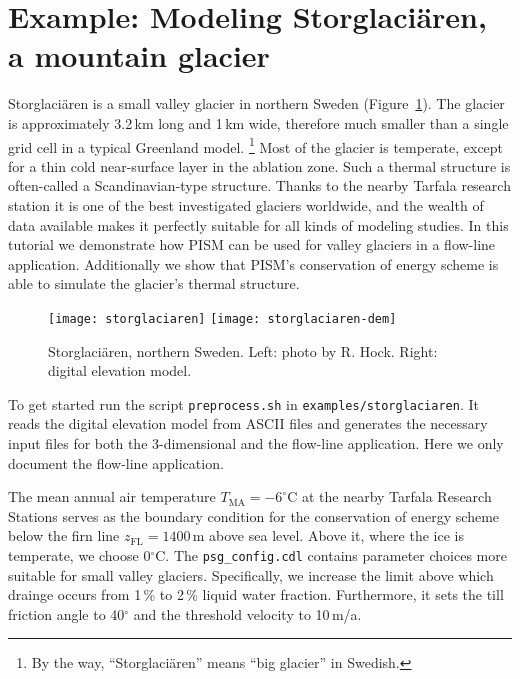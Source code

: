 
\section{Example: Modeling Storglaci{\"a}ren, a mountain glacier}\label{sec:storglaciaren} 

Storglaci{\"a}ren is a small valley glacier in northern Sweden (Figure~\ref{fig:storglaciaren}). The glacier is approximately 3.2\,km long and 1\,km wide, therefore much smaller than a single grid cell in a typical Greenland model. \footnote{By the way, ``Storglaci{\"a}ren'' means ``big glacier'' in Swedish.} Most of the glacier is temperate, except for a thin cold near-surface layer in the ablation zone. Such a thermal structure is often-called a Scandinavian-type structure. Thanks to the nearby Tarfala research station it is one of the best investigated glaciers worldwide, and the wealth of data available makes it perfectly suitable for all kinds of modeling studies. In this tutorial we demonstrate how PISM can be used for valley glaciers in a flow-line application. Additionally we show that PISM's conservation of energy scheme is able to simulate the glacier's thermal structure.

\begin{figure}[ht]
  \centering
  \texttt{[image: storglaciaren]}\qquad
  \texttt{[image: storglaciaren-dem]}
  \caption{Storglaci{\"a}ren, northern Sweden. Left: photo by R. Hock. Right: digital elevation model.}
  \label{fig:storglaciaren}
\end{figure}

To get started run the script \texttt{preprocess.sh} in \texttt{examples/storglaciaren}. It reads the digital elevation model from ASCII files and generates the necessary input files for both the 3-dimensional and the flow-line application. Here we only document the flow-line application.

The mean annual air temperature $T_{\mathrm{MA}}=-6^{\circ}$C at the nearby Tarfala Research Stations serves as the boundary condition for the conservation of energy scheme below the firn line $z_{\textrm{FL}} = 1400$\,m above sea level. Above it, where the ice is temperate, we choose 0$^{\circ}$C. The \texttt{psg_config.cdl} contains parameter choices more suitable for small valley glaciers. Specifically, we increase the limit above which drainge occurs from 1\,\% to 2\,\% liquid water fraction. Furthermore, it sets the till friction angle to 40$^{\circ}$ and the threshold velocity to 10\,m/a.

